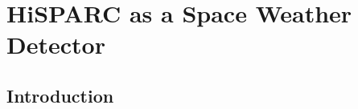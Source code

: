 \chapter{HiSPARC as a Space Weather Detector}\label{chap:HiSPARC}

\section{Introduction}\label{sec:HS_intro}

%
%
%
%


%


